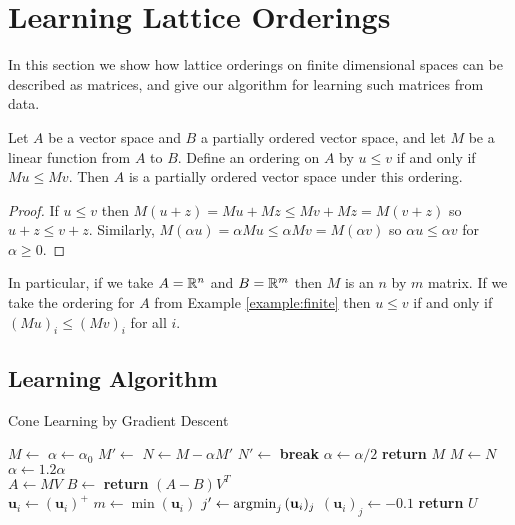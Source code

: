 \section{Learning Lattice Orderings}

In this section we show how lattice orderings on finite dimensional
spaces can be described as matrices, and give our algorithm for
learning such matrices from data.

\begin{proposition}
  Let $A$ be a vector space and $B$ a partially ordered vector space,
  and let $M$ be a linear function from $A$ to $B$. Define an ordering
  on $A$ by $u\le v$ if and only if $Mu \le Mv$. Then $A$ is a
  partially ordered vector space under this ordering.
\end{proposition}

\begin{proof}
If $u \le v$ then $M(u + z) = Mu + Mz \le Mv + Mz = M(v +
z)$ so $u + z \le v + z$. Similarly, $M(\alpha u) = \alpha Mu
\le\alpha Mv = M(\alpha v)$ so $\alpha u \le \alpha v$ for
$\alpha \ge 0$.
\end{proof}

In particular, if we take $A = \mathbb{R}^n$ and $B = \mathbb{R}^m$ then $M$ is an $n$
by $m$ matrix. If we take the ordering for $A$ from Example
\ref{example:finite} then $u\le v$ if and only if $(Mu)_i \le (Mv)_i$
for all $i$.

\subsection{Learning Algorithm}

\begin{algorithm}
\caption{Cone Learning by Gradient Descent}\label{algorithm:cone}
\begin{algorithmic}
  \State $M \gets$ 
  \State $\alpha \gets \alpha_0$
  \Loop
    \State $M' \gets$ 
    \Loop
      \State $N \gets M - \alpha M'$
      \State $N' \gets$ 
        \State \textbf{break}
      \EndIf
      \State $\alpha \gets \alpha/2$
        \State \textbf{return} $M$
      \EndIf
    \EndLoop
    \State $M \gets N$
    \State $\alpha \gets 1.2\alpha$
  \EndLoop
  \EndProcedure
  \\
  \State $A \gets MV$
  \State $B \gets$ 
  \State \textbf{return} $(A - B)V^T$
  \EndProcedure
  \\
      \State $\mathbf{u}_i \gets (\mathbf{u}_i)^+$
    \Else
      \State $m \gets \min(\mathbf{u}_i)$
        \State $j' \gets \operatorname*{\arg\!\min}_j{(\mathbf{u}_i)_j}$
        \State $(\mathbf{u}_i)_j \gets -0.1$
      \EndIf
    \EndIf
  \EndFor
  \State \textbf{return} $U$
  \EndProcedure
\end{algorithmic}
\end{algorithm}

